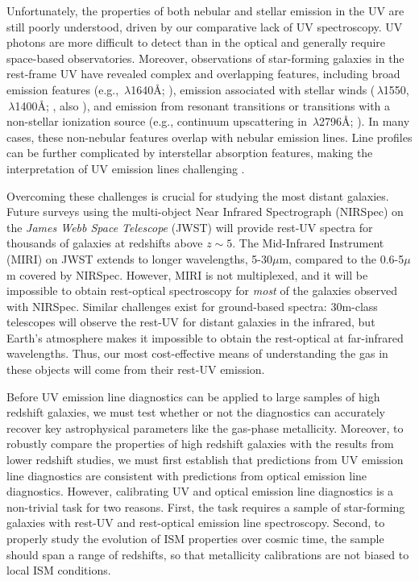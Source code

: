 \documentclass[trackchanges, preprint2]{aastex62}
\newcommand{\heii}{\ion{He}{2}}
\newcommand{\civ}{\ion{C}{4}}
\newcommand{\ang}{\ensuremath{\mbox{\AA}}\xspace}
\begin{document}
Unfortunately, the properties of both nebular and stellar emission in the UV are still poorly understood, driven by our comparative lack of UV spectroscopy. UV photons are more difficult to detect than in the optical and generally require space-based observatories. Moreover, observations of star-forming galaxies in the rest-frame UV have revealed complex and overlapping features, including broad emission features (e.g., \heii$\,\lambda$1640\ang; \citealt{Leitherer+2018}), emission associated with stellar winds (\civ$\,\lambda$1550, $\,\lambda$1400\ang; \citealt{Pettini+2000}, also \citealt{Chisholm+2019}), and emission from resonant transitions or transitions with a non-stellar ionization source (e.g., continuum upscattering in $\,\lambda$2796\ang; \citealt{Rigby+2014}). In many cases, these non-nebular features overlap with nebular emission lines. Line profiles can be further complicated by interstellar absorption features, making the interpretation of UV emission lines challenging \citep{Vidal-Garcia+2017}.

Overcoming these challenges is crucial for studying the most distant galaxies. Future surveys using the multi-object Near Infrared Spectrograph (NIRSpec) on the {\it James Webb Space Telescope} (JWST) will provide rest-UV spectra for thousands of galaxies at redshifts above $z{\sim}5$. The Mid-Infrared Instrument (MIRI) on JWST extends to longer wavelengths, 5-30$\mu$m, compared to the 0.6-5$\mu$m covered by NIRSpec. However, MIRI is not multiplexed, and it will be impossible to obtain rest-optical spectroscopy for \emph{most} of the galaxies observed with NIRSpec. Similar challenges exist for ground-based spectra: 30m-class telescopes will observe the rest-UV for distant galaxies in the infrared, but Earth's atmosphere makes it impossible to obtain the rest-optical at far-infrared wavelengths. Thus, our most cost-effective means of understanding the gas in these objects will come from their rest-UV emission. 

Before UV emission line diagnostics can be applied to large samples of high redshift galaxies, we must test whether or not the diagnostics can accurately recover key astrophysical parameters like the gas-phase metallicity. Moreover, to robustly compare the properties of high redshift galaxies with the results from lower redshift studies, we must first establish that predictions from UV emission line diagnostics are consistent with predictions from optical emission line diagnostics. However, calibrating UV and optical emission line diagnostics is a non-trivial task for two reasons. First, the task requires a sample of star-forming galaxies with rest-UV and rest-optical emission line spectroscopy. Second, to properly study the evolution of ISM properties over cosmic time, the sample should span a range of redshifts, so that metallicity calibrations are not biased to local ISM conditions.
\end{document}
